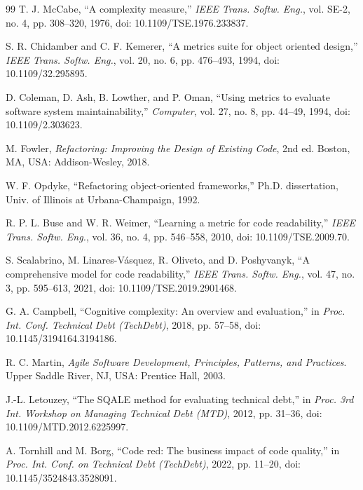 \documentclass[journal,onecolumn,11pt]{IEEEtran}
\begin{document}
\begin{thebibliography}{99}
 T. J. McCabe, ``A complexity measure,'' \emph{IEEE Trans. Softw. Eng.}, vol. SE-2, no. 4, pp. 308--320, 1976, doi: 10.1109/TSE.1976.233837.

 S. R. Chidamber and C. F. Kemerer, ``A metrics suite for object oriented design,'' \emph{IEEE Trans. Softw. Eng.}, vol. 20, no. 6, pp. 476--493, 1994, doi: 10.1109/32.295895.

 D. Coleman, D. Ash, B. Lowther, and P. Oman, ``Using metrics to evaluate software system maintainability,'' \emph{Computer}, vol. 27, no. 8, pp. 44--49, 1994, doi: 10.1109/2.303623.

 M. Fowler, \emph{Refactoring: Improving the Design of Existing Code}, 2nd ed. Boston, MA, USA: Addison-Wesley, 2018.

 W. F. Opdyke, ``Refactoring object-oriented frameworks,'' Ph.D. dissertation, Univ. of Illinois at Urbana-Champaign, 1992.

 R. P. L. Buse and W. R. Weimer, ``Learning a metric for code readability,'' \emph{IEEE Trans. Softw. Eng.}, vol. 36, no. 4, pp. 546--558, 2010, doi: 10.1109/TSE.2009.70.

 S. Scalabrino, M. Linares-V\'asquez, R. Oliveto, and D. Poshyvanyk, ``A comprehensive model for code readability,'' \emph{IEEE Trans. Softw. Eng.}, vol. 47, no. 3, pp. 595--613, 2021, doi: 10.1109/TSE.2019.2901468.

 G. A. Campbell, ``Cognitive complexity: An overview and evaluation,'' in \emph{Proc. Int. Conf. Technical Debt (TechDebt)}, 2018, pp. 57--58, doi: 10.1145/3194164.3194186.

 R. C. Martin, \emph{Agile Software Development, Principles, Patterns, and Practices}. Upper Saddle River, NJ, USA: Prentice Hall, 2003.

 J.-L. Letouzey, ``The SQALE method for evaluating technical debt,'' in \emph{Proc. 3rd Int. Workshop on Managing Technical Debt (MTD)}, 2012, pp. 31--36, doi: 10.1109/MTD.2012.6225997.

 A. Tornhill and M. Borg, ``Code red: The business impact of code quality,'' in \emph{Proc. Int. Conf. on Technical Debt (TechDebt)}, 2022, pp. 11--20, doi: 10.1145/3524843.3528091.


\end{thebibliography}
\end{document}
